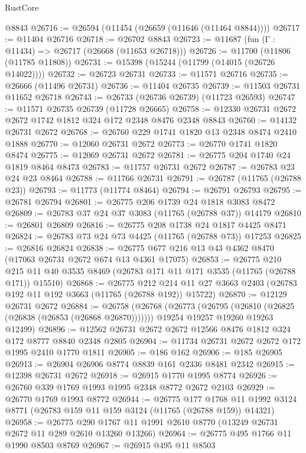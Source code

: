 \begin{lexlean}{RustCore}
\begin{coremodule}
    @8843
@26716 := @26594 (@11454 (@26659 (@11646 (@11464 @8844))))
@26717 := @11404 @26716
@26718 := @26702 @8843
@26723 := @11687 (fun (Γ : @11434) => @26717 (@26668 (@11653 @26718)))
@26726 := @11700 (@11806 (@11785 @11808))
@26731 := @15398 (@15244 (@11799 (@14015 (@26726 @14022))))
@26732 := @26723 @26731
@26733 := @11571 @26716
@26735 := @26666 (@11496 @26731)
@26736 := @11404 @26735
@26739 := @11503 @26731 @11652 @26718
@26743 := @26733 (@26736 @26739) (@11723 @26593)
@26747 := @11571 @26735 @26739 (@11728 @26665)
@26758 := @12330 @26731 @2672 @2672 @1742 @1812 @324 @172 @2348 @8476 @2348 @8843
@26760 := @14132 @26731 @2672
@26768 := @26760 @229 @1741 @1820 @13 @2348 @8474 @2410 @1888
@26770 := @12060 @26731 @2672
@26773 := @26770 @1741 @1820 @8474
@26775 := @12069 @26731 @2672
@26781 := @26775 @204 @1740 @24 @1819 @8464 @8473
@26783 := @11757 @26731 @2672
@26787 := @26783 @23 @24 @23 @8464
@26788 := @11766 @26731
@26791 := @26787 (@11765 (@26788 @23))
@26793 := @11773 (@11774 @8464)
@26794 := @26791 @26793
@26795 := @26781 @26794
@26801 := @26775 @206 @1739 @24 @1818 @3083 @8472
@26809 := @26783 @37 @24 @37 @3083 (@11765 (@26788 @37)) @14179
@26810 := @26801 @26809
@26816 := @26775 @208 @1738 @24 @1817 @4425 @8471
@26824 := @26783 @73 @24 @73 @4425 (@11765 (@26788 @73)) @17253
@26825 := @26816 @26824
@26838 := @26775 @677 @216 @13 @43 @4362 @8470 (@17063 @26731 @2672 @674 @13 @4361 @17075)
@26853 := @26775
    @210
    @215
    @11
    @40
    @3535
    @8469
    (@26783 @171 @11 @171 @3535 (@11765 (@26788 @171)) @15510)
@26868 := @26775
    @212
    @214
    @11
    @27
    @3663
    @2403
    (@26783 @192 @11 @192 @3663 (@11765 (@26788 @192)) @15722)
@26870 := @12129 @26731 @2672
@26884 := @26758
    (@26768
      (@26773 (@26795 (@26810 (@26825 (@26838 (@26853 (@26868 @26870)))))))
      @19254
      @19257
      @19260
      @19263
      @12499)
@26896 := @12562 @26731 @2672 @2672 @12566 @8476 @1812 @324 @172 @8777 @8840 @2348 @2805
@26904 := @11734 @26731 @2672 @2672 @172 @1995 @2410 @1770 @1811
@26905 := @186 @162
@26906 := @185 @26905
@26913 := @26904 @26906 @8774 @8839 @161 @2336 @8481 @2342
@26915 := @12398 @26731 @2672
@26918 := @26915 @1770 @1995 @8774
@26926 := @26760 @339 @1769 @1993 @1995 @2348 @8772 @2672 @2103
@26929 := @26770 @1769 @1993 @8772
@26944 := @26775
    @177
    @1768
    @11
    @1992
    @3124
    @8771
    (@26783 @159 @11 @159 @3124 (@11765 (@26788 @159)) @14321)
@26958 := @26775 @290 @1767 @11 @1991 @2610 @8770 (@13249 @26731 @2672 @11 @289 @2610 @13260 @13266)
@26964 := @26775 @495 @1766 @11 @1990 @8503 @8769
@26967 := @26915 @495 @11 @8503

\end{coremodule}
\end{lexlean}
